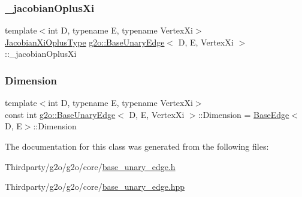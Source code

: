\subsubsection{\texorpdfstring{\+\_\+jacobian\+Oplus\+Xi}{\_jacobianOplusXi}}
{\footnotesize\ttfamily template$<$int D, typename E, typename Vertex\+Xi$>$ \\
\mbox{\hyperlink{classg2o_1_1_base_unary_edge_a24bcabd661223e15b7337f2835310f5e}{Jacobian\+Xi\+Oplus\+Type}} \mbox{\hyperlink{classg2o_1_1_base_unary_edge}{g2o\+::\+Base\+Unary\+Edge}}$<$ D, E, Vertex\+Xi $>$\+::\+\_\+jacobian\+Oplus\+Xi\hspace{0.3cm}{\ttfamily [protected]}}

\mbox{\label{classg2o_1_1_base_unary_edge_a4e584cf552998a34948d8d5b484f7fd3}} 
\subsubsection{\texorpdfstring{Dimension}{Dimension}}
{\footnotesize\ttfamily template$<$int D, typename E, typename Vertex\+Xi$>$ \\
const int \mbox{\hyperlink{classg2o_1_1_base_unary_edge}{g2o\+::\+Base\+Unary\+Edge}}$<$ D, E, Vertex\+Xi $>$\+::Dimension = \mbox{\hyperlink{classg2o_1_1_base_edge}{Base\+Edge}}$<$D, E$>$\+::Dimension\hspace{0.3cm}{\ttfamily [static]}}



The documentation for this class was generated from the following files\+:\begin{DoxyCompactItemize}
\item 
Thirdparty/g2o/g2o/core/\mbox{\hyperlink{base__unary__edge_8h}{base\+\_\+unary\+\_\+edge.\+h}}\item 
Thirdparty/g2o/g2o/core/\mbox{\hyperlink{base__unary__edge_8hpp}{base\+\_\+unary\+\_\+edge.\+hpp}}\end{DoxyCompactItemize}
